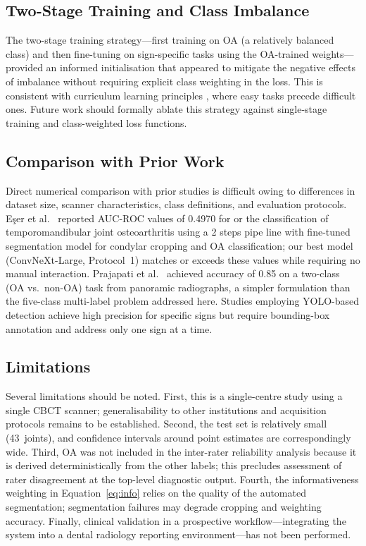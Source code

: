 \documentclass[review,12pt]{elsarticle}
\begin{document}
\subsection{Two-Stage Training and Class Imbalance}

The two-stage training strategy---first training on OA (a relatively
balanced class) and then fine-tuning on sign-specific tasks using the
OA-trained weights---provided an informed initialisation that appeared to
mitigate the negative effects of imbalance without requiring explicit
class weighting in the loss. This is consistent with curriculum learning
principles \cite{bengio2009curriculum}, where easy tasks precede difficult ones.
Future work should formally ablate this strategy against single-stage
training and class-weighted loss functions.

\subsection{Comparison with Prior Work}

Direct numerical comparison with prior studies is difficult owing to
differences in dataset size, scanner characteristics, class definitions,
and evaluation protocols. Eşer et al.~\cite{ecser2023classification} reported AUC-ROC
values of 0.4970 for or the classification of temporomandibular joint
osteoarthritis using a 2 steps pipe line with fine-tuned segmentation model for condylar cropping and OA classification; our best model
(ConvNeXt-Large, Protocol~1) matches or exceeds these values while
requiring no manual interaction. Prajapati et al.~\cite{choi2025artificial}
achieved accuracy of 0.85 on a two-class (OA vs.\ non-OA) task from
panoramic radiographs, a simpler formulation than the five-class
multi-label problem addressed here. Studies employing YOLO-based
detection \cite{Ariji2019,Kuwana2021} achieve high precision for
specific signs but require bounding-box annotation and address only
one sign at a time.

\subsection{Limitations}

Several limitations should be noted. First, this is a single-centre
study using a single CBCT scanner; generalisability to other institutions
and acquisition protocols remains to be established. Second, the test set
is relatively small (43~joints), and confidence intervals around point
estimates are correspondingly wide. Third, OA was not included in the
inter-rater reliability analysis because it is derived deterministically
from the other labels; this precludes assessment of rater disagreement
at the top-level diagnostic output. Fourth, the informativeness weighting
in Equation~\ref{eq:info} relies on the quality of the automated
segmentation; segmentation failures may degrade cropping and
weighting accuracy. Finally, clinical validation in a prospective
workflow---integrating the system into a dental radiology reporting
environment---has not been performed.
\end{document}
